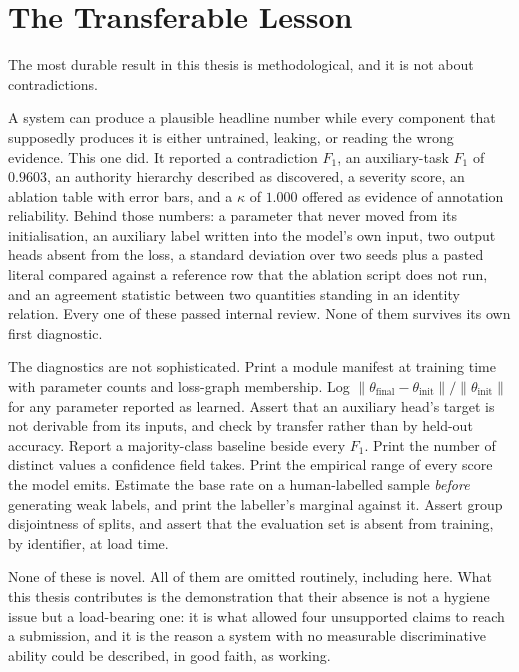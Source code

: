\section{The Transferable Lesson}
\label{sec:conc-lesson}

The most durable result in this thesis is methodological, and it is not about
contradictions.

A system can produce a plausible headline number while every component that
supposedly produces it is either untrained, leaking, or reading the wrong
evidence. This one did. It reported a contradiction $F_1$, an auxiliary-task
$F_1$ of $0.9603$, an authority hierarchy described as discovered, a severity
score, an ablation table with error bars, and a $\kappa$ of $1.000$ offered as
evidence of annotation reliability. Behind those numbers: a parameter that never
moved from its initialisation, an auxiliary label written into the model's own
input, two output heads absent from the loss, a standard deviation over two
seeds plus a pasted literal compared against a reference row that the ablation
script does not run, and an agreement statistic between two quantities standing
in an identity relation. Every one of these passed internal review. None of them
survives its own first diagnostic.

The diagnostics are not sophisticated. Print a module manifest at training time
with parameter counts and loss-graph membership. Log
$\lVert\theta_{\text{final}} - \theta_{\text{init}}\rVert /
\lVert\theta_{\text{init}}\rVert$ for any parameter reported as learned. Assert
that an auxiliary head's target is not derivable from its inputs, and check by
transfer rather than by held-out accuracy. Report a majority-class baseline
beside every $F_1$. Print the number of distinct values a confidence field takes.
Print the empirical range of every score the model emits. Estimate the base rate
on a human-labelled sample \emph{before} generating weak labels, and print the
labeller's marginal against it. Assert group disjointness of splits, and assert
that the evaluation set is absent from training, by identifier, at load time.

None of these is novel. All of them are omitted routinely, including here. What
this thesis contributes is the demonstration that their absence is not a hygiene
issue but a load-bearing one: it is what allowed four unsupported claims to
reach a submission, and it is the reason a system with no measurable
discriminative ability could be described, in good faith, as working.

